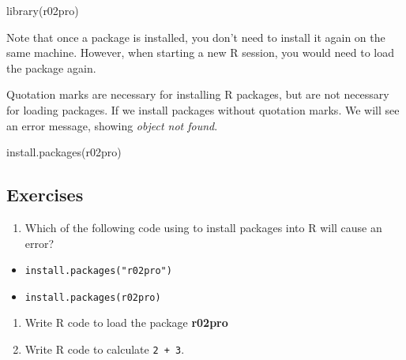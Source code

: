 \documentclass[
]{book}
\newenvironment{Shaded}{\begin{snugshade}}{\end{snugshade}}
\newcommand{\FunctionTok}[1]{\textcolor[rgb]{0.00,0.00,0.00}{#1}}
\newcommand{\NormalTok}[1]{#1}
\providecommand{\tightlist}{%
  \setlength{\itemsep}{0pt}\setlength{\parskip}{0pt}}
\newenvironment{blackbox}{
  \definecolor{shadecolor}{rgb}{0, 0, 0}  %
  \color{white}
  \begin{shaded}}
 {\end{shaded}}
\newenvironment{infobox}[1]
  {
  \begin{itemize}
  \renewcommand{\labelitemi}{
    \raisebox{-.7\height}[0pt][0pt]{
      {\setkeys{Gin}{width=3em,keepaspectratio}
        \texttt{[image: pics/\#1]}}
    }
  }
  \setlength{\fboxsep}{1em}
  \begin{blackbox}
  \item
  }
  {
  \end{blackbox}
  \end{itemize}
  }
\begin{document}
\begin{Shaded}
\begin{Highlighting}[]
\FunctionTok{library}\NormalTok{(r02pro)}
\end{Highlighting}
\end{Shaded}

Note that once a package is installed, you don't need to install it again on the same machine. However, when starting a new R session, you would need to load the package again.

\begin{infobox}{caution}

Quotation marks are necessary for installing R packages, but are not necessary for loading packages. If we install packages without quotation marks. We will see an error message, showing \emph{object not found}.

\begin{Shaded}
\begin{Highlighting}[]
\FunctionTok{install.packages}\NormalTok{(r02pro)}
\end{Highlighting}
\end{Shaded}

\end{infobox}

\hypertarget{exercises}{%
\subsection{Exercises}\label{exercises}}

\begin{enumerate}
\def\labelenumi{\arabic{enumi}.}
\tightlist
\item
  Which of the following code using to install packages into R will cause an error?
\end{enumerate}

\begin{itemize}
\tightlist
\item
  \texttt{install.packages("r02pro")}
\item
  \texttt{install.packages(r02pro)}
\end{itemize}

\begin{enumerate}
\def\labelenumi{\arabic{enumi}.}
\setcounter{enumi}{1}
\item
  Write R code to load the package \textbf{r02pro}
\item
  Write R code to calculate \texttt{2\ +\ 3}.
\end{enumerate}
\end{document}
